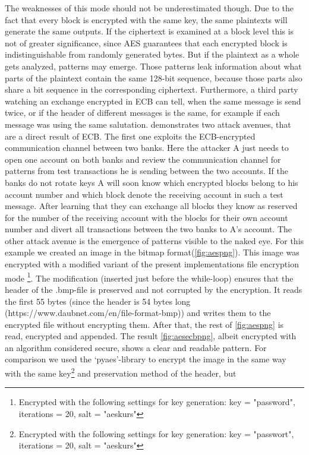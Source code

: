 The weaknesses of this mode
should not be underestimated though. Due to the fact that every block is
encrypted with the same key, the same plaintexts will generate the same
outputs. If the ciphertext is examined at a block level this is not of
greater significance, since AES guarantees that each encrypted block is
indistinguishable from randomly generated bytes. But if the plaintext as
a whole gets analyzed, patterns may emerge. Those patterns leak
information about what parts of the plaintext contain the same 128-bit
sequence, because those parts also share a bit sequence in
the corresponding ciphertext. Furthermore, a third party watching an
exchange encrypted in ECB can tell, when the same
message is send twice, or if the header of different messages is the
same, for example if each message was using the same salutation. \cite{paar}
demonstrates two attack avenues, that are a direct result of ECB. The
first one exploits the ECB-encrypted communication channel between two
banks. Here the attacker A just needs to open one account on both banks
and review the communication channel for patterns from test transactions
he is sending between the two accounts. If the banks do not rotate keys
A will soon know which encrypted blocks belong to his account number and
which block denote the receiving account in such a test message. After learning that they can
exchange all blocks they know as reserved for the number of the
receiving account with the blocks for their own account number and
divert all transactions between the two banks to A's account. The other
attack avenue is the emergence of patterns visible to the naked eye. For
this example we created an image in the bitmap format(\ref{fig:aespng}). This
image was encrypted with a modified variant of the present
implementations file encryption mode \footnote{Encrypted with the following settings for key generation: key = "password", iterations = 20, salt = "aeskurs"}. The modification (inserted just
before the while-loop) ensures that the header of the .bmp-file is
preserved and not corrupted by the encryption. It reads the first 55
bytes (since the header is 54 bytes long
(https://www.daubnet.com/en/file-format-bmp)) and writes them to the
encrypted file without encrypting them. After that, the rest of \ref{fig:aespng}
is read, encrypted and appended. The result \ref{fig:aesecbpng}, albeit encrypted
with an algorithm considered secure, shows a clear and readable pattern.
For comparison we used the `pyaes'-library to encrypt the image in the
same way with the same key\footnote{Encrypted with the following settings for key generation: key = "passwort", iterations = 20, salt = "aeskurs"} and preservation method of the header, but
